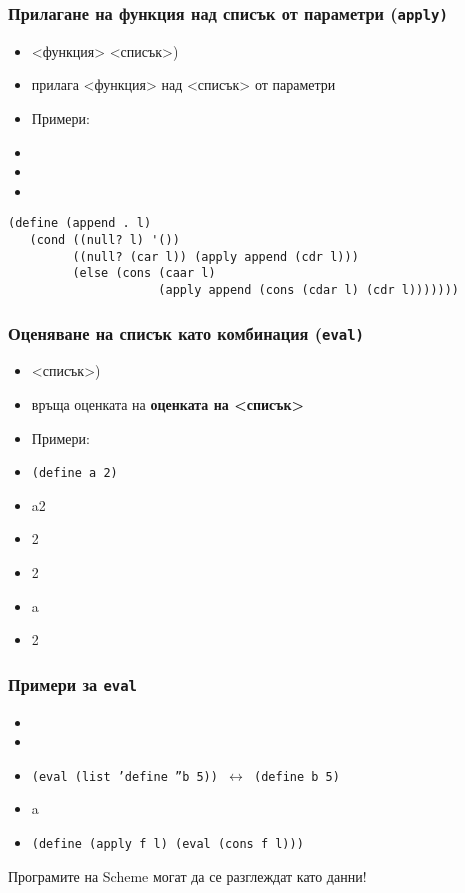 \documentclass{beamer}
\begin{document}
\begin{frame}[fragile]
  \frametitle{Прилагане на функция над списък от параметри (\tt{apply})}

  \begin{itemize}[<+->]
  \item {}<функция> <списък>\tta)
  \item прилага <функция> над <списък> от параметри
  \item Примери:
  \item {}
  \item {}
  \item {}
  \end{itemize}

  \onslide<+->
\small
\begin{verbatim}
(define (append . l)
   (cond ((null? l) '())
         ((null? (car l)) (apply append (cdr l)))
         (else (cons (caar l)
                     (apply append (cons (cdar l) (cdr l)))))))
\end{verbatim}
\end{frame}

\begin{frame}
  \frametitle{Оценяване на списък като комбинация (\tt{eval})}

  \begin{itemize}[<+->]
  \item {}<списък>\tta)
  \item връща оценката на \textbf{оценката на <списък>}
  \item Примери:
  \item \tt{(define a 2)}
  \item \evalsto a2
  \item {}2
  \item {}2
  \item {}a
  \item {}2
  \end{itemize}
\end{frame}

\begin{frame}
  \frametitle{Примери за \tt{eval}}

  \begin{itemize}[<+->]
  \item {}
  \item {}
  \item \tt{(eval (list 'define ''b 5))} $\longleftrightarrow$ \tt{(define b 5)}
  \item {\small {}a}
  \item \tt{(define (apply f l) (eval (cons f l)))}
  \end{itemize}

  \onslide<+->
  \alert{Програмите на Scheme могат да се разглеждат като данни!}
\end{frame}
\end{document}

